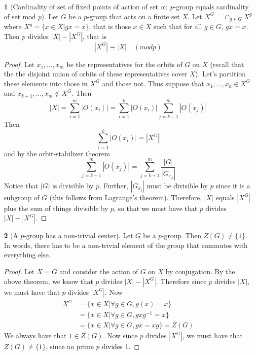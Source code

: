 \documentclass[12pt]{article}
\theoremstyle{definition}
\newtheorem{theorem}{\color{ForestGreen}{\textbf{Theorem}}}
\theoremstyle{definition}
\begin{document}
\begin{theorem}[Cardinality of set of fixed points of action of set on $p$-group equals cardinality of set mod $p$]\label{lemma:favlemma}
	Let $G$ be a $p$-group that acts on a finite set $X$. Let $X^G = \cap_{g \in G} X^g$ where $X^g = \{x\in X| gx =x\}$, that is those $x\in X$ such that for all $g\in G$, $gx = x$. Then $p$ divides $|X| - |X^G|$, that is
	\begin{equation}
		|X^G| \equiv |X| \quad (mod p)
	\end{equation}
\end{theorem}
\begin{proof}
Let $x_1, \ldots, x_m$ be the representatives for the orbits of $G$ on $X$ (recall that the the disjoint union of orbits of these representatives cover $X$). Let's partition these elements into those in $X^G$ and those not. Thus suppose that $x_1, \ldots, x_k \in X^G$ and $x_{k+1}, \ldots, x_m \not\in X^G$. Then
\begin{equation}
	|X| = \sum_{i=1}^m |O(x_i)| = \sum_{i=1}^k |O(x_i)| \sum_{j=k+1}^m |O(x_j)|
\end{equation}
Then
\begin{equation}
	\sum_{i=1}^k |O(x_i)| = |X^G|
\end{equation}
and by the orbit-stabilizer theorem
\begin{equation}
	\sum_{j=k+1}^m |O(x_j)| = \sum_{j=k+1}^m \frac{|G|}{|G_{x_j}|}
\end{equation}
Notice that $|G|$ is divisible by $p$. Further, $|G_{x_j}|$ must be divisible by $p$ since it is a subgroup of $G$ (this follows from Lagrange's theorem). Therefore, $|X|$ equals $|X^G|$ plus the sum of things divisible by $p$, so that we must have that $p$ divides $|X| - |X^G|$. 
\end{proof}

\begin{theorem}[A $p$-group has a non-trivial center]
	Let $G$ be a $p$-group. Then $Z(G) \neq \{1\}$.  In words, there has to be a non-trivial element of the group that commutes with everything else.
\end{theorem}
\begin{proof}
	Let $X = G$ and consider the action of $G$ on $X$ by conjugation. By the above theorem, we know that $p$ divides $|X| - |X^G|$. Therefore since $p$ divides $|X|$, we must have that $p$ divides $|X^G|$. Now
	\begin{align*}
		X^G &= \{x\in X | \forall g \in G, g(x) = x\} \\
		&= \{x\in X | \forall g \in G, gxg^{-1} = x\} \\
		&= \{x\in X | \forall g \in G, gx = xg\} = Z(G)
	\end{align*}
	We always have that $1 \in Z(G)$. Now since $p$ divides $|X^G|$, we must have that $Z(G) \neq \{1\}$, since no prime $p$ divides 1.  
\end{proof}
\end{document}

